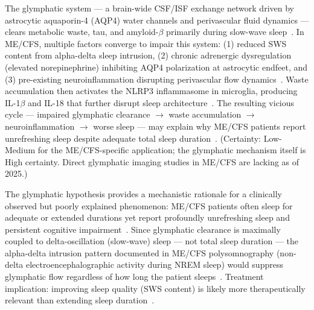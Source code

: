 \begin{hypothesis}
\label{hyp:ch15-glymphatic-vicious-cycle}
The glymphatic system --- a brain-wide CSF/ISF exchange network driven by astrocytic aquaporin-4 (AQP4) water channels and perivascular fluid dynamics --- clears metabolic waste, tau, and amyloid-$\beta$ primarily during slow-wave sleep~\cite{Xie2013glymphatic}. In ME/CFS, multiple factors converge to impair this system: (1) reduced SWS content from alpha-delta sleep intrusion, (2) chronic adrenergic dysregulation (elevated norepinephrine) inhibiting AQP4 polarization at astrocytic endfeet, and (3) pre-existing neuroinflammation disrupting perivascular flow dynamics~\cite{NematGorgani2025glymphatic}. Waste accumulation then activates the NLRP3 inflammasome in microglia, producing IL-1$\beta$ and IL-18 that further disrupt sleep architecture~\cite{NematGorgani2025glymphatic, Ding2025glymphaticAD}. The resulting vicious cycle --- impaired glymphatic clearance $\to$ waste accumulation $\to$ neuroinflammation $\to$ worse sleep --- may explain why ME/CFS patients report unrefreshing sleep despite adequate total sleep duration~\cite{Wostyn2018glymphatic, NematGorgani2025glymphatic}.
(Certainty: Low-Medium for the ME/CFS-specific application; the glymphatic mechanism itself is High certainty. Direct glymphatic imaging studies in ME/CFS are lacking as of 2025.)
\end{hypothesis}

\begin{observation}
\label{obs:ch15-glymphatic-sleep-quality}
The glymphatic hypothesis provides a mechanistic rationale for a clinically observed but poorly explained phenomenon: ME/CFS patients often sleep for adequate or extended durations yet report profoundly unrefreshing sleep and persistent cognitive impairment~\cite{Wostyn2018glymphatic}. Since glymphatic clearance is maximally coupled to delta-oscillation (slow-wave) sleep --- not total sleep duration --- the alpha-delta intrusion pattern documented in ME/CFS polysomnography (non-delta electroencephalographic activity during NREM sleep) would suppress glymphatic flow regardless of how long the patient sleeps~\cite{NematGorgani2025glymphatic, Xie2013glymphatic}. Treatment implication: improving sleep quality (SWS content) is likely more therapeutically relevant than extending sleep duration~\cite{NematGorgani2025glymphatic}.
\end{observation}


